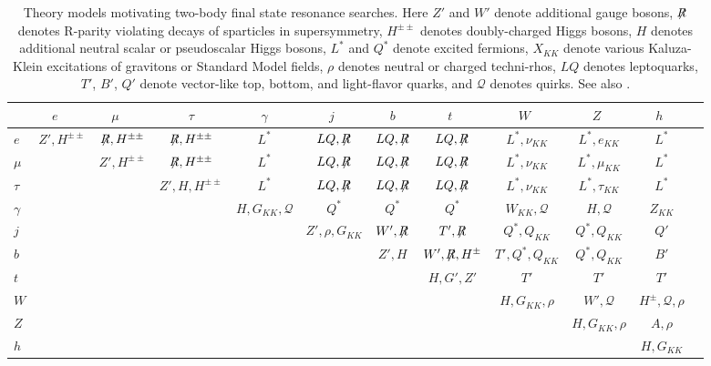 \begin{table}
\caption{ Theory models motivating two-body final state resonance searches. Here $Z'$ and $W'$ denote additional gauge bosons, $\not \! \! R$ denotes R-parity violating decays of sparticles in supersymmetry, $H^{\pm \pm}$ denotes doubly-charged Higgs bosons, $H$ denotes additional neutral scalar or pseudoscalar Higgs bosons, $L^*$ and $Q^*$ denote excited fermions, $X_{KK}$ denote various Kaluza-Klein excitations of gravitons or Standard Model fields, $\rho$ denotes neutral or charged techni-rhos, $LQ$ denotes leptoquarks, $T'$, $B'$, $Q'$ denote vector-like top, bottom, and light-flavor quarks, and $\mathcal{Q}$ denotes quirks. See also \cite{KCKong}. }
\begin{tabular}{lccccccccccc}
\hline
\hline
 & $e$\ \   & $\mu$\ \   & \ \  $\tau$\ \   & \ \  $\gamma$\ \   & \ \  $j$ \ \   & \ \  $b$\ \  & \ \ $t$ \ \ & \ \ $W$ \ \ & \ \ $Z$ \ \ & \ \ $h$ \ \   \\
\hline
$e$ &  $Z',H^{\pm\pm} $ & $\not \! \! R,H^{\pm\pm} $ & $\not \! \! R,H^{\pm\pm} $ & $L^*$  & $LQ,\not \!\! R$ & $LQ, \not \!\! R$ & $LQ,\not \!\! R$ & $L^*, \nu_{KK}$ & $L^*, e_{KK}$ & $L^*$ \\
$ \mu $ &  & $Z',H^{\pm\pm}$ & $\not \! \! R,H^{\pm\pm} $ & $L^*$  & $LQ,\not \!\! R$ & $LQ, \not \!\! R$ & $LQ,\not \!\! R$ & $L^*, \nu_{KK}$ & $L^*, \mu_{KK}$ & $L^*$ \\
$\tau$ &  &  & $Z',H,H^{\pm\pm}$ & $L^*$ & $LQ, \not \!\! R$ & $LQ,\not \!\! R$ & $LQ,\not \!\! R$ & $L^*, \nu_{KK}$ & $L^*, \tau_{KK}$ & $L^*$ \\
$\gamma$ &  & & & $H, G_{KK}, \mathcal{Q}$ & $Q^*$ & $Q^*$ & $Q^*$ & $W_{KK}, \mathcal{Q}$ & $H, \mathcal{Q}$ & $Z_{KK}$\\
$j$ &  &  &  &  & $Z',\rho, G_{KK}$ & $W',\not \!\! R$ & $T', \not \!\! R$ & $Q^*, Q_{KK}$  & $Q^*, Q_{KK}$  & $Q'$\\
$b$  &  &  &  &  &  & $Z',H$ & $W', \not \!\! R, H^\pm$ &  $T',Q^*, Q_{KK}$  & $Q^*, Q_{KK}$  & $B'$\\
$t$ &  &  &  &  &  &   & $H,G',Z'$ & $T'$ & $T'$  & $T'$\\
$W$ &  &  &  &  &  &  &  & $H, G_{KK}, \rho$ & $W', \mathcal{Q}$ & $H^\pm, \mathcal{Q}, \rho$ \\
$Z$ &  &  &  &  &  &  &  &  & $H, G_{KK}, \rho$ & $A, \rho$   \\
$h$ &  &  &  &  &  &  &  &  &  & $H, G_{KK}$ \\

\hline
\hline
\end{tabular}
\label{tab:restheory}
\end{table}



